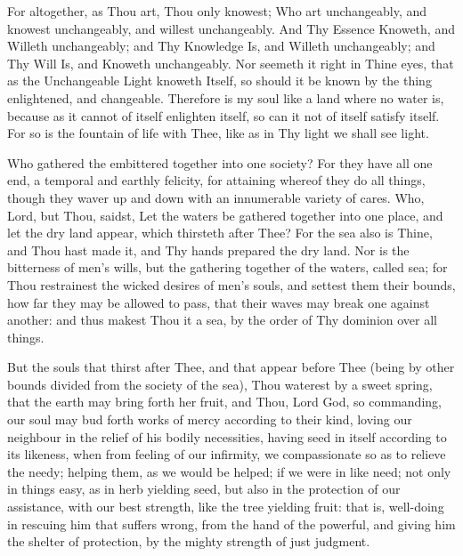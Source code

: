 \documentclass[b5paper,openright,12pt,twoside]{book}
\begin{document}
For altogether, as Thou art, Thou only knowest; Who art unchangeably,
and knowest unchangeably, and willest unchangeably. And Thy Essence
Knoweth, and Willeth unchangeably; and Thy Knowledge Is, and Willeth
unchangeably; and Thy Will Is, and Knoweth unchangeably. Nor seemeth it
right in Thine eyes, that as the Unchangeable Light knoweth Itself, so
should it be known by the thing enlightened, and changeable. Therefore
is my soul like a land where no water is, because as it cannot of itself
enlighten itself, so can it not of itself satisfy itself. For so is the
fountain of life with Thee, like as in Thy light we shall see light.

Who gathered the embittered together into one society? For they have all
one end, a temporal and earthly felicity, for attaining whereof they do
all things, though they waver up and down with an innumerable variety of
cares. Who, Lord, but Thou, saidst, Let the waters be gathered together
into one place, and let the dry land appear, which thirsteth after Thee?
For the sea also is Thine, and Thou hast made it, and Thy hands prepared
the dry land. Nor is the bitterness of men's wills, but the gathering
together of the waters, called sea; for Thou restrainest the wicked
desires of men's souls, and settest them their bounds, how far they may
be allowed to pass, that their waves may break one against another: and
thus makest Thou it a sea, by the order of Thy dominion over all things.

But the souls that thirst after Thee, and that appear before Thee (being
by other bounds divided from the society of the sea), Thou waterest by
a sweet spring, that the earth may bring forth her fruit, and Thou, Lord
God, so commanding, our soul may bud forth works of mercy according
to their kind, loving our neighbour in the relief of his bodily
necessities, having seed in itself according to its likeness, when from
feeling of our infirmity, we compassionate so as to relieve the needy;
helping them, as we would be helped; if we were in like need; not only
in things easy, as in herb yielding seed, but also in the protection of
our assistance, with our best strength, like the tree yielding fruit:
that is, well-doing in rescuing him that suffers wrong, from the hand
of the powerful, and giving him the shelter of protection, by the mighty
strength of just judgment.
\end{document}
